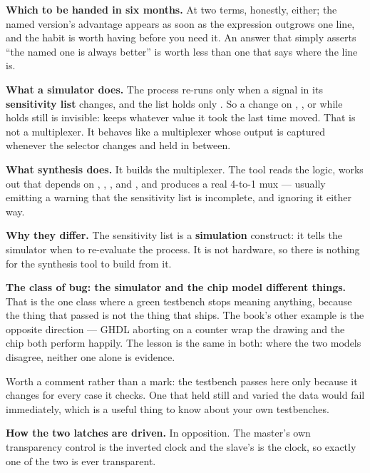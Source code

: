 \textbf{Which to be handed in six months.} At two terms, honestly, either; the named version's
advantage appears as soon as the expression outgrows one line, and the habit is worth having before
you need it. An answer that simply asserts ``the named one is always better'' is worth less than
one that says where the line is. 

\textbf{What a simulator does.} The process re-runs only when a signal in its \textbf{sensitivity
list} changes, and the list holds only . So a change on , ,  or
 while  holds still is invisible:  keeps whatever value it took the last
time  moved. That is not a multiplexer. It behaves like a multiplexer whose output is
captured whenever the selector changes and held in between.

\textbf{What synthesis does.} It builds the multiplexer. The tool reads the logic, works out that
 depends on , , ,  and , and produces a real
4-to-1 mux --- usually emitting a warning that the sensitivity list is incomplete, and ignoring it
either way. 

\textbf{Why they differ.} The sensitivity list is a \textbf{simulation} construct: it tells the
simulator when to re-evaluate the process. It is not hardware, so there is nothing for the synthesis
tool to build from it.

\textbf{The class of bug: the simulator and the chip model different things.} That is the one class
where a green testbench stops meaning anything, because the thing that passed is not the thing that
ships. The book's other example is the opposite direction --- GHDL aborting on a counter wrap the
drawing and the chip both perform happily. The lesson is the same in both: where the two models
disagree, neither one alone is evidence. 

Worth a comment rather than a mark: the testbench passes here only because it changes 
for every case it checks. One that held  still and varied the data would fail
immediately, which is a useful thing to know about your own testbenches.


\textbf{How the two latches are driven.} In opposition. The master's own transparency control is
the inverted clock and the slave's is the clock, so exactly one of the two is ever transparent.


